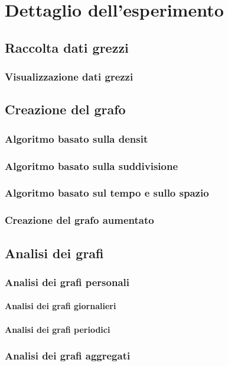
\chapter{Dettaglio dell'esperimento} %
\label{Capitolo 4}


\section{Raccolta dati grezzi}
\subsection{Visualizzazione dati grezzi}
\section{Creazione del grafo}
\subsection{Algoritmo basato sulla densit}
\subsection{Algoritmo basato sulla suddivisione}
\subsection{Algoritmo basato sul tempo e sullo spazio}
\subsection{Creazione del grafo aumentato}
\section{Analisi dei grafi}
\subsection{Analisi dei grafi personali}
\subsubsection{Analisi dei grafi giornalieri}
\subsubsection{Analisi dei grafi periodici}
\subsection{Analisi dei grafi aggregati}